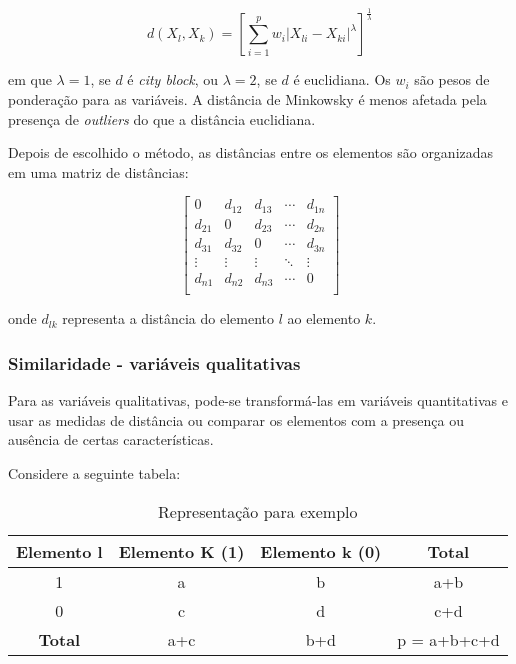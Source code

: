\documentclass[
  portuguese,
]{estat/estat}
\begin{document}
\[
d(X_{l}, X_{k}) = \left[ \sum_{i=1}^{p} w_{i} |X_{li} - X_{ki}|^\lambda \right]^{\frac{1}{\lambda}}
\]

em que \(\lambda = 1\), se \(d\) é \emph{city block}, ou
\(\lambda = 2\), se \(d\) é euclidiana. Os \(w_{i}\) são pesos de
ponderação para as variáveis. A distância de Minkowsky é menos afetada
pela presença de \emph{outliers} do que a distância euclidiana.

Depois de escolhido o método, as distâncias entre os elementos são
organizadas em uma matriz de distâncias:

\[
\begin{bmatrix}
        0 & d_{12} & d_{13} & \cdots & d_{1n} \\
        d_{21} & 0 & d_{23} & \cdots & d_{2n} \\
        d_{31} & d_{32} & 0 & \cdots & d_{3n} \\
    \vdots & \vdots & \vdots & \ddots & \vdots \\
        d_{n1} & d_{n2} & d_{n3} & \cdots & 0 \\
\end{bmatrix}
\]

onde \(d_{lk}\) representa a distância do elemento \(l\) ao elemento
\(k\).

\subsubsection{Similaridade - variáveis
qualitativas}\label{similaridade---variuxe1veis-qualitativas}

Para as variáveis qualitativas, pode-se transformá-las em variáveis
quantitativas e usar as medidas de distância ou comparar os elementos
com a presença ou ausência de certas características.

Considere a seguinte tabela:

\begin{table}[H]
\centering
\caption{Representação para exemplo}
\begin{tabular}{c | c c c}
\toprule
\textbf{Elemento l} & \textbf{Elemento K (1)} & \textbf{Elemento k (0)} & \textbf{Total} \\
\midrule
1      & a & b & a+b \\
0       & c & d & c+d \\
\midrule
\textbf{Total} & a+c & b+d & p = a+b+c+d \\ 
\bottomrule
\end{tabular}
\end{table}
\end{document}
